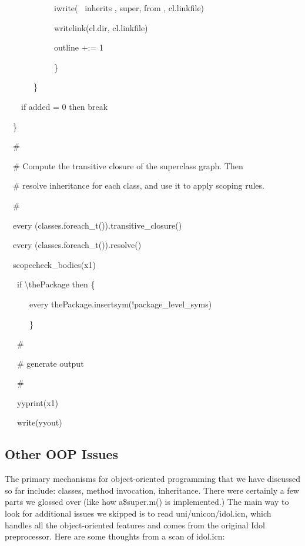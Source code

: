 {\ttfamily\mdseries
\ \ \ \ \ \ \ \ \ \ \ \ iwrite({\textquotedbl} \ inherits {\textquotedbl}, super, {\textquotedbl} from {\textquotedbl},
cl.linkfile)}

{\ttfamily\mdseries
\ \ \ \ \ \ \ \ \ \ \ \ writelink(cl.dir, cl.linkfile)}

{\ttfamily\mdseries
\ \ \ \ \ \ \ \ \ \ \ \ outline +:= 1}

{\ttfamily\mdseries
\ \ \ \ \ \ \ \ \ \ \ \ \}}

{\ttfamily\mdseries
\ \ \ \ \ \ \ \}}

{\ttfamily\mdseries
\ \ \ \ if added = 0 then break}

{\ttfamily\mdseries
\ \ \}}

{\ttfamily\mdseries
\ \ \#}

{\ttfamily\mdseries
\ \ \# Compute the transitive closure of the superclass graph. Then}

{\ttfamily\mdseries
\ \ \# resolve inheritance for each class, and use it to apply scoping rules.}

{\ttfamily\mdseries
\ \ \#}

{\ttfamily\mdseries
\ \ every (classes.foreach\_t()).transitive\_closure()}

{\ttfamily\mdseries
\ \ every (classes.foreach\_t()).resolve()}


\bigskip

{\ttfamily\mdseries
\ \ scopecheck\_bodies(x1)}


\bigskip

{\ttfamily\mdseries
\ \ \ if {\textbackslash}thePackage then \{}

{\ttfamily\mdseries
\ \ \ \ \ \ every thePackage.insertsym(!package\_level\_syms)}

{\ttfamily\mdseries
\ \ \ \ \ \ \}}


\bigskip

{\ttfamily\mdseries
\ \ \ \#}

{\ttfamily\mdseries
\ \ \ \# generate output}

{\ttfamily\mdseries
\ \ \ \#}

{\ttfamily\mdseries
\ \ \ yyprint(x1)}

{\ttfamily\mdseries
\ \ \ write(yyout)}

\subsection{Other OOP Issues}

The primary mechanisms for object-oriented programming that we have
discussed so far include: classes, method invocation,
inheritance. There were certainly a few parts we glossed over (like
how a\$super.m() is implemented.) The main way to look for additional
issues we skipped is to read uni/unicon/idol.icn, which handles all
the object-oriented features and comes from the original Idol
preprocessor. Here are some thoughts from a scan of idol.icn:

